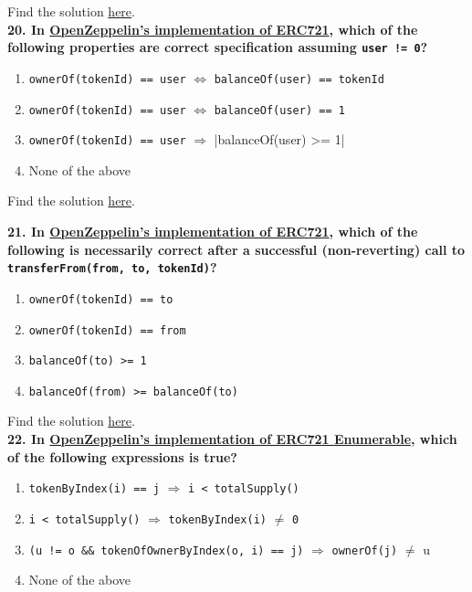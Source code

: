 Find the solution \hyperref[sec:raceXcertora_q19]{here}.\\

\textbf{20. In \href{https://github.com/OpenZeppelin/openzeppelin-contracts/blob/master/contracts/token/ERC721/ERC721.sol}{OpenZeppelin’s implementation of ERC721}, which of the following properties are correct specification assuming \texttt{user != 0}?}

\begin{enumerate}[label=\Alph*.]
    \item\verb|ownerOf(tokenId) == user| $\Leftrightarrow$ \verb|balanceOf(user) == tokenId|
    \item\verb|ownerOf(tokenId) == user| $\Leftrightarrow$ \verb|balanceOf(user) == 1|
    \item\verb|ownerOf(tokenId) == user| $\Rightarrow$ |balanceOf(user) >= 1|
    \item None of the above
\end{enumerate}

Find the solution \hyperref[sec:raceXcertora_q20]{here}.\\

\pagebreak

\textbf{21. In \href{https://github.com/OpenZeppelin/openzeppelin-contracts/blob/master/contracts/token/ERC721/ERC721.sol}{OpenZeppelin’s implementation of ERC721}, which of the following is necessarily correct after a successful (non-reverting) call to \texttt{transferFrom(from, to, tokenId)}?}

\begin{enumerate}[label=\Alph*.]
    \item\verb|ownerOf(tokenId) == to|
    \item\verb|ownerOf(tokenId) == from|
    \item\verb|balanceOf(to) >= 1|
    \item\verb|balanceOf(from) >= balanceOf(to)|
\end{enumerate}

Find the solution \hyperref[sec:raceXcertora_q21]{here}.\\

\textbf{22. In \href{https://github.com/OpenZeppelin/openzeppelin-contracts/blob/master/contracts/token/ERC721/extensions/ERC721Enumerable.sol}{OpenZeppelin’s implementation of ERC721 Enumerable}, which of the following expressions is true?}

\begin{enumerate}[label=\Alph*.]
    \item\verb|tokenByIndex(i) == j| $\Rightarrow$ \verb|i < totalSupply()|
    \item\verb|i < totalSupply()| $\Rightarrow$ \verb|tokenByIndex(i)| $\neq$ \verb|0|
    \item\verb|(u != o && tokenOfOwnerByIndex(o, i) == j)| $\Rightarrow$ \verb|ownerOf(j)| $\neq$ u
    \item None of the above
\end{enumerate}

